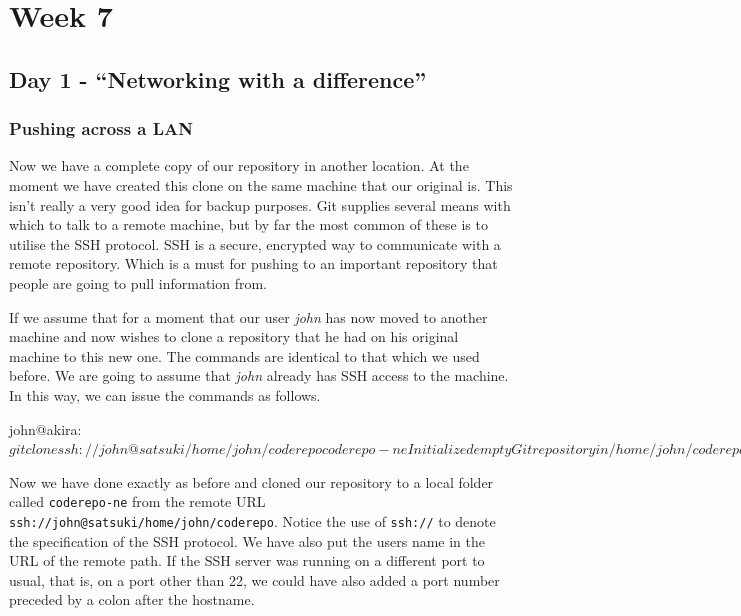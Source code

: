 \cleardoublepage
\chapter{Week 7}

\section{Day 1 - ``Networking with a difference''}
\subsection{Pushing across a LAN}

Now we have a complete copy of our repository in another location.
At the moment we have created this clone on the same machine that our original is.
This isn't really a very good idea for backup purposes.
Git supplies several means with which to talk to a remote machine, but by far the most common of these is to utilise the SSH protocol.
SSH is a secure, encrypted way to communicate with a remote repository.
Which is a must for pushing to an important repository that people are going to pull information from.

If we assume that for a moment that our user \emph{john} has now moved to another machine and now wishes to clone a repository that he had on his original machine to this new one.
The commands are identical to that which we used before.
We are going to assume that \emph{john} already has SSH access to the machine.
In this way, we can issue the commands as follows.

\begin{code}
john@akira:~$ git clone ssh://john@satsuki/home/john/coderepo coderepo-ne
Initialized empty Git repository in /home/john/coderepo-ne/.git/
john@akira's password:
remote: Counting objects: 53, done.
remote: Compressing objects: 100%
Receiving objects: 100%
Resolving deltas: 100%
remote: Total 53 (delta 10), reused 0 (delta 0)
john@akira:~$
\end{code}

Now we have done exactly as before and cloned our repository to a local folder called \texttt{coderepo-ne} from the remote URL \texttt{ssh://john@satsuki/home/john/coderepo}.
Notice the use of \texttt{ssh://} to denote the specification of the SSH protocol.
We have also put the users name in the URL of the remote path.
If the SSH server was running on a different port to usual, that is, on a port other than 22, we could have also added a port number preceded by a colon after the hostname.

